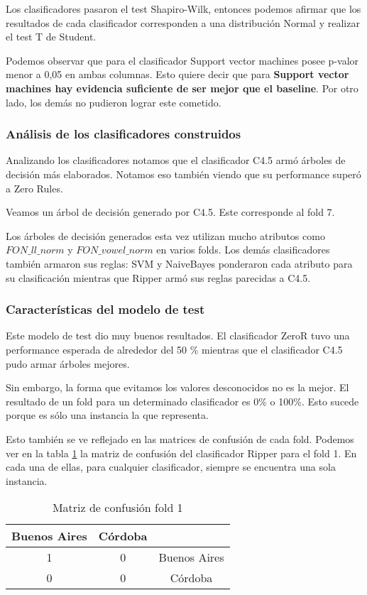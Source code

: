 Los clasificadores pasaron el test Shapiro-Wilk, entonces podemos afirmar que los resultados de cada clasificador corresponden a una distribución Normal y realizar el test T de Student.

Podemos observar que para el clasificador Support vector machines posee p-valor menor a 0,05 en ambas columnas. Esto quiere decir que para \textbf{Support vector machines hay evidencia suficiente de ser mejor que el baseline}. Por otro lado, los demás no pudieron lograr este cometido. 

\subsubsection{Análisis de los clasificadores construidos}

Analizando los clasificadores notamos que el clasificador C4.5 armó árboles de decisión más elaborados. Notamos eso también viendo que su performance superó a Zero Rules. 

Veamos un árbol de decisión generado por C4.5. Este corresponde al fold 7. 

Los árboles de decisión generados esta vez utilizan mucho  atributos como $FON\_ll\_norm$ y $FON\_vowel\_norm$ en varios folds. Los demás clasificadores también armaron sus reglas: SVM y NaiveBayes ponderaron cada atributo para su clasificación mientras que Ripper armó sus reglas parecidas a C4.5. 

\subsubsection{Características del modelo de test}

Este modelo de test dio muy buenos resultados. El clasificador ZeroR tuvo una performance esperada de alrededor del 50 \% mientras que el clasificador C4.5 pudo armar árboles mejores. 

Sin embargo, la forma que evitamos los valores desconocidos no es la mejor. El resultado de un fold para un determinado clasificador es 0\% o 100\%. Esto sucede porque es sólo una instancia la que representa. 

Esto también se ve reflejado en las matrices de confusión de cada fold. Podemos ver en la tabla \ref{PAH_mat_conf_f1_solo0o1} la matriz de confusión del clasificador Ripper para el fold 1. En cada una de ellas, para cualquier clasificador, siempre se encuentra una sola instancia. 

\begin{table}[H]
	\centering
	\begin{tabular}{|c|c|c|}
		\hline
		Buenos Aires & Córdoba & \\ \hline
		1 & 0 & Buenos Aires\\ \hline
		0 & 0 & Córdoba\\ \hline
	\end{tabular}
	\caption{Matriz de confusión fold 1}
	\label{PAH_mat_conf_f1_solo0o1}
\end{table}
